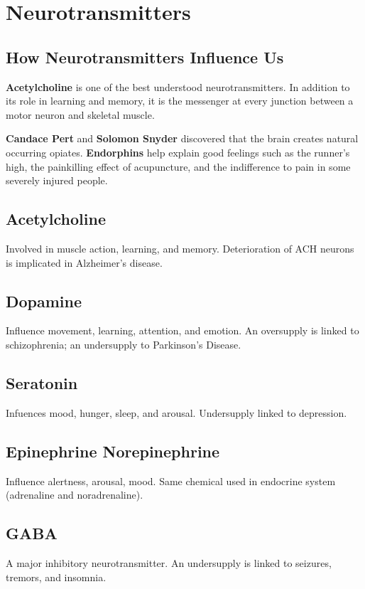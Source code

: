 \documentclass[12pt]{article}
\begin{document}
\section*{Neurotransmitters}
\subsection*{How Neurotransmitters Influence Us}
\textbf{Acetylcholine} is one of the best understood neurotransmitters. In addition to its role in learning and memory, it is the messenger at every junction between a motor neuron and skeletal muscle.

{\bf Candace Pert} and {\bf Solomon Snyder} discovered that the brain creates natural occurring opiates. \textbf{Endorphins} help explain good feelings such as the runner's high, the painkilling effect of acupuncture, and the indifference to pain in some severely injured people.

\subsection*{Acetylcholine}
Involved in muscle action, learning, and memory. Deterioration of ACH neurons is implicated in Alzheimer's disease.

\subsection*{Dopamine}
Influence movement, learning, attention, and emotion. An oversupply is linked to schizophrenia; an undersupply to Parkinson's Disease.

\subsection*{Seratonin}
Infuences mood, hunger, sleep, and arousal. Undersupply linked to depression.

\subsection*{Epinephrine Norepinephrine}
Influence alertness, arousal, mood. Same chemical used in endocrine system (adrenaline and noradrenaline).

\subsection*{GABA}
A major inhibitory neurotransmitter. An undersupply is linked to seizures, tremors, and insomnia.
\end{document}
